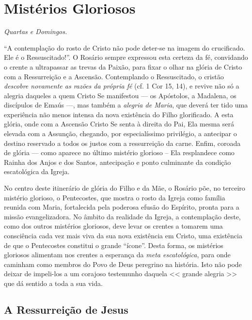 \documentclass{rosario}
\begin{document}

\chapter{Mistérios Gloriosos}

\emph{Quartas e Domingos.}


``A contemplação do rosto de Cristo não pode deter-se na imagem do crucificado.
Ele é o Ressuscitado!''.
O Rosário sempre expressou esta certeza da fé, convidando o crente a ultrapassar as trevas da Paixão, para fixar o olhar na glória de Cristo com a Ressurreição e a Ascensão.
Contemplando o Ressuscitado, o cristão \emph{descobre novamente as razões da própria fé} (cf. 1 Cor 15, 14), e revive não só a alegria daqueles a quem Cristo Se manifestou --- os Apóstolos,
a Madalena, os discípulos de Emaús ---, mas também a \emph{alegria de Maria}, que deverá ter tido uma experiência não menos intensa da nova existência do Filho glorificado.
A esta glória, onde com a Ascensão Cristo Se senta à direita do Pai, Ela mesma será elevada com a Assunção, chegando, por especialíssimo privilégio, a antecipar o destino reservado a todos os justos com a
ressurreição da carne.
Enfim, coroada de glória --- como aparece no último mistério glorioso -- Ela resplandece como Rainha dos Anjos e dos Santos, antecipação e ponto culminante da condição escatológica da Igreja.

No centro deste itinerário de glória do Filho e da Mãe, o Rosário põe, no terceiro mistério glorioso, o Pentecostes, que mostra o rosto da Igreja como família reunida com Maria, fortalecida pela poderosa efusão do Espírito, pronta para a missão evangelizadora.
No âmbito da realidade da Igreja, a contemplação deste, como dos outros mistérios gloriosos, deve levar os crentes a tomarem uma consciência cada vez mais viva da sua nova existência em Cristo, uma existência de que o Pentecostes constitui o grande ``ícone''.
Desta forma, os mistérios gloriosos alimentam nos crentes a esperança da \emph{meta escatológica}, para onde caminham como membros do Povo de Deus peregrino na história.
Isto não pode deixar de impeli-los a um corajoso testemunho daquela << grande alegria >> que dá sentido a toda a sua vida.


\section{A Ressurreição de Jesus}
\end{document}
